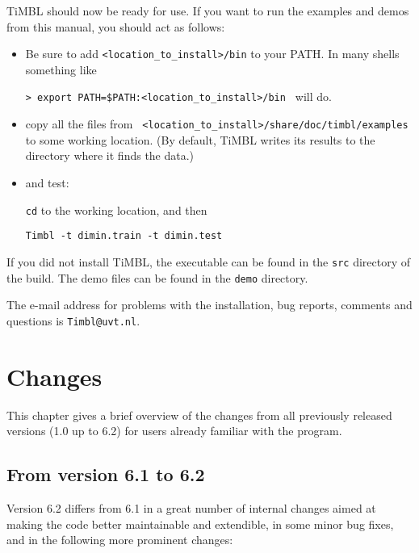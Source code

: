 \documentclass{report}
\begin{document}
TiMBL should now be ready for use. If you want to run the examples and demos from this manual, you should act as follows:

\begin{itemize}
\item Be sure to add {\tt <location\_to\_install>/bin} to your PATH. 
In many shells something like

 {\tt > export PATH=\$PATH:<location\_to\_install>/bin }
will do.
\item copy all the files from {\tt
  <location\_to\_install>/share/doc/timbl/examples} to some working
location. (By default, TiMBL writes its results to the directory where
it finds the data.)
\item and test:

{\tt cd} to the working location, and then

{\tt Timbl -t dimin.train -t dimin.test}
\end{itemize}

If you did not install TiMBL, the executable can be found in the {\tt src} directory of the build. The demo files can be found in the {\tt demo} directory.

The e-mail address for problems with the installation, bug reports, comments and questions is {\tt Timbl@uvt.nl}.

\chapter{Changes}
\label{changes}

This chapter gives a brief overview of the changes from all previously released versions (1.0 up to 6.2) for users already familiar with the program.

\section{From version 6.1 to 6.2}

Version 6.2 differs from 6.1 in a great number of internal changes aimed at making the code better maintainable and extendible, in some minor bug fixes, and in the following more prominent changes:
\end{document}
